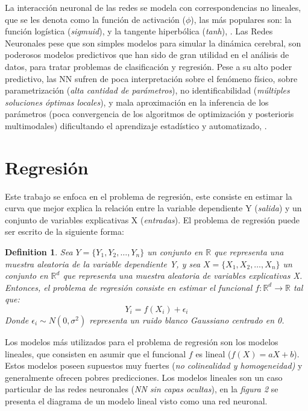 \documentclass[nojss]{jss}
\newtheorem{Def}{Definition}
\begin{document}
La interacción neuronal de las redes se modela con correspondencias no lineales, que se les denota como la función de activación ($\phi$), las más populares son: la función logística (\textit{sigmuid}), y la  tangente hiperbólica (\textit{tanh}), \cite{Bhat2006}. Las Redes Neuronales pese que son simples modelos para simular la dinámica cerebral, son poderosos modelos predictivos que han sido de gran utilidad en el análisis de datos, para tratar problemas de clasificación y regresión. Pese a su alto poder predictivo, las NN sufren de poca interpretación sobre el fenómeno físico,  sobre parametrización (\textit{alta cantidad de parámetros}), no identificabilidad (\textit{múltiples soluciones óptimas locales}), y mala aproximación en la inferencia de los parámetros (poca convergencia de los algoritmos de optimización y posterioris multimodales) dificultando el aprendizaje estadístico y automatizado, \cite{Arya2017}. 

\section{Regresión}

Este trabajo se enfoca en el problema de regresión, este consiste en estimar la curva que mejor explica la relación entre la variable dependiente Y (\textit{salida}) y un conjunto de variables explicativas X (\textit{entradas}). El problema de regresión puede ser escrito de la siguiente forma:

\begin{Def}
	Sea $Y = \{Y_1,Y_2,\ldots,Y_n\}$ un conjunto en $\mathbb{R}$ que representa una muestra aleatoria de la variable dependiente Y, y sea $X = \{X_1,X_2,\ldots,X_n\}$ un conjunto en $\mathbb{R}^d$ que representa una muestra aleatoria de variables explicativas X. Entonces, el problema de regresión consiste en estimar el funcional $f:\mathbb{R}^d \rightarrow \mathbb{R}$ tal que:
	$$Y_i = f(X_i) +\epsilon_i$$
	Donde $\epsilon_i \sim N(0,\sigma^2)$ representa un ruido blanco Gaussiano centrado en 0.
\end{Def}

Los modelos más utilizados para  el problema de regresión son los modelos lineales, que consisten en asumir que el funcional $f$ es lineal ($f(X) = aX +b$). Estos modelos poseen supuestos muy fuertes (\textit{no colinealidad y homogeneidad)} y generalmente ofrecen pobres predicciones. Los modelos lineales son un caso particular de las redes neuronales (\textit{NN sin capas ocultas}), en la \textit{figura 2} se presenta el diagrama de un modelo lineal visto como una red neuronal.
\end{document}
